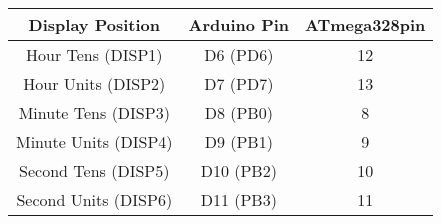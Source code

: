 \begin{table}[h!]
    \centering
    \begin{tabular}{|c|c|c|}
        \hline
        \textbf{Display Position} & \textbf{Arduino Pin} & \textbf{ATmega328pin} \\
        \hline
        Hour Tens (DISP1) & D6 (PD6) & 12\\
        Hour Units (DISP2) & D7 (PD7)&13\\
        Minute Tens (DISP3) & D8 (PB0)&8\\
        Minute Units (DISP4) & D9 (PB1)&9\\
        Second Tens (DISP5) & D10 (PB2)&10\\
        Second Units (DISP6) & D11 (PB3)&11\\
        \hline
    \end{tabular}
\end{table}

